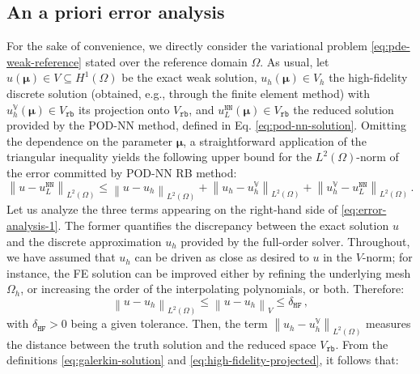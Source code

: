 \documentclass[12pt, a4paper, twoside, openright, notitlepage]{report}
\numberwithin{equation}{chapter}
\theoremstyle{theorem}
\theoremstyle{definition}
\theoremstyle{remark}
\theoremstyle{proposition}
\numberwithin{figure}{chapter}
\newcommand{\norm}[1]{\left\lVert#1\right\rVert}
\newcommand{\bg}[1]{\boldsymbol{#1}}
\begin{document}
		\algrenewcommand\textproc{\textsc}
		
	\vspace*{0.01cm}
				
	\subsection{An a priori error analysis}
	\label{section:An a priori error analysis}
	
		For the sake of convenience, we directly consider the variational problem \eqref{eq:pde-weak-reference} stated over the reference domain $\Omega$. As usual, let $u(\bg{\mu}) \in V \subseteq H^1(\Omega)$ be the exact weak solution, $u_h(\bg{\mu}) \in V_h$ the high-fidelity discrete solution (obtained, e.g., through the finite element method) with $u_h^{\mathbb{V}}(\bg{\mu}) \in V_{\texttt{rb}}$ its projection onto $V_{\texttt{rb}}$, and $u_L^{\texttt{NN}}(\bg{\mu}) \in V_{\texttt{rb}}$ the reduced solution provided by the POD-NN method, defined in Eq. \eqref{eq:pod-nn-solution}. Omitting the dependence on the parameter $\bg{\mu}$, a straightforward application of the triangular inequality yields the following upper bound for the $L^2(\Omega)$-norm of the error committed by POD-NN RB method:
		\begin{equation}
			\label{eq:error-analysis-1}
			\norm{u - u_L^{\texttt{NN}}}_{L^2(\Omega)} \leq \norm{u - u_h}_{L^2(\Omega)} + \norm{u_h - u_h^{\mathbb{V}}}_{L^2(\Omega)} + \norm{u_h^{\mathbb{V}} - u_L^{\texttt{NN}}}_{L^2(\Omega)} \, .
		\end{equation}
		Let us analyze the three terms appearing on the right-hand side of \eqref{eq:error-analysis-1}. The former quantifies the discrepancy between the exact solution $u$ and the discrete approximation $u_h$ provided by the full-order solver. Throughout, we have assumed that $u_h$ can be driven as close as desired to $u$ in the $V$-norm; for instance, the FE solution can be improved either by refining the underlying mesh $\Omega_h$, or increasing the order of the interpolating polynomials, or both. Therefore:
		\begin{equation}
			\label{eq:error-analysis-2}
			\norm{u - u_h}_{L^2(\Omega)} \leq \norm{u - u_h}_V \leq \delta_{\texttt{HF}} \, ,
		\end{equation} 
		with $\delta_{\texttt{HF}} > 0$ being a given tolerance. Then, the term $\norm{u_h - u_h^{\mathbb{V}}}_{L^2(\Omega)}$ measures the distance between the truth solution and the reduced space $V_{\texttt{rb}}$. From the definitions \eqref{eq:galerkin-solution} and \eqref{eq:high-fidelity-projected}, it follows that:
\end{document}
